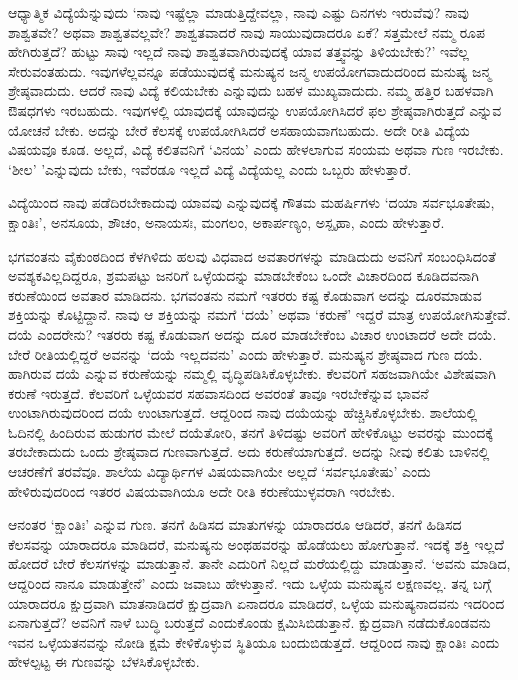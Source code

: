 ಆಧ್ಯಾತ್ಮಿಕ ವಿದ್ಯೆಯೆನ್ನುವುದು `ನಾವು ಇಷ್ಟೆಲ್ಲಾ ಮಾಡುತ್ತಿದ್ದೇವಲ್ಲಾ, ನಾವು ಎಷ್ಟು ದಿನಗಳು ಇರುವೆವು? ನಾವು ಶಾಶ್ವತವೇ? ಅಥವಾ ಶಾಶ್ವತವಲ್ಲವೇ? ಶಾಶ್ವತವಾದರೆ 
ನಾವು ಸಾಯುವುದಾದರೂ ಏಕೆ? ಸತ್ತಮೇಲೆ ನಮ್ಮ ರೂಪ ಹೇಗಿರುತ್ತದೆ? ಹುಟ್ಟು ಸಾವು ಇಲ್ಲದೆ ನಾವು ಶಾಶ್ವತವಾಗಿರುವುದಕ್ಕೆ ಯಾವ 
ತತ್ತ್ವವನ್ನು ತಿಳಿಯಬೇಕು?' ಇವೆಲ್ಲ ಸೇರುವಂತಹುದು. ಇವುಗಳೆಲ್ಲವನ್ನೂ ಪಡೆಯುವುದಕ್ಕೆ ಮನುಷ್ಯನ ಜನ್ಮ ಉಪಯೋಗವಾದುದರಿಂದ ಮನುಷ್ಯ 
ಜನ್ಮ ಶ್ರೇಷ್ಠವಾದುದು. ಆದರೆ ನಾವು ವಿದ್ಯೆ ಕಲಿಯಬೇಕು ಎನ್ನುವುದು ಬಹಳ ಮುಖ್ಯವಾದುದು. ನಮ್ಮ ಹತ್ತಿರ ಬಹಳವಾಗಿ ಔಷಧಗಳು ಇರಬಹುದು. 
ಇವುಗಳಲ್ಲಿ ಯಾವುದಕ್ಕೆ ಯಾವುದನ್ನು ಉಪಯೋಗಿಸಿದರೆ ಫಲ ಶ್ರೇಷ್ಠವಾಗಿರುತ್ತದೆ ಎನ್ನುವ ಯೋಚನೆ ಬೇಕು. ಅದನ್ನು ಬೇರೆ ಕೆಲಸಕ್ಕೆ ಉಪಯೋಗಿಸಿದರೆ 
ಅಸಹಾಯವಾಗಬಹುದು. ಅದೇ ರೀತಿ ವಿದ್ಯೆಯ ವಿಷಯವೂ ಕೂಡ. ಅಲ್ಲದೆ, ವಿದ್ಯೆ ಕಲಿತವನಿಗೆ `ವಿನಯ' ಎಂದು ಹೇಳಲಾಗುವ ಸಂಯಮ ಅಥವಾ 
ಗುಣ ಇರಬೇಕು. `ಶೀಲ' 'ಎನ್ನುವುದು ಬೇಕು, ಇವೆರಡೂ ಇಲ್ಲದೆ ವಿದ್ಯೆ ವಿದ್ಯೆಯಲ್ಲ ಎಂದು ಒಬ್ಬರು ಹೇಳುತ್ತಾರೆ.

ವಿದ್ಯೆಯಿಂದ ನಾವು ಪಡೆದಿರಬೇಕಾದುವು ಯಾವವು ಎನ್ನುವುದಕ್ಕೆ ಗೌತಮ ಮಹರ್ಷಿಗಳು `ದಯಾ ಸರ್ವಭೂತೇಷು, ಕ್ಷಾಂತಿಃ', ಅನಸೂಯ, ಶೌಚಂ, 
ಅನಾಯಸಃ, ಮಂಗಲಂ, ಅಕಾರ್ಪಣ್ಯಂ, ಅಸ್ಪೃಹಾ, ಎಂದು ಹೇಳುತ್ತಾರೆ.

ಭಗವಂತನು ವೈಕುಂಠದಿಂದ ಕೆಳಗಿಳಿದು ಹಲವು ವಿಧವಾದ ಅವತಾರಗಳನ್ನು ಮಾಡಿದುದು ಅವನಿಗೆ ಸಂಬಂಧಿಸಿದಂತೆ ಅವಶ್ಯಕವಿಲ್ಲದಿದ್ದರೂ, ಶ್ರಮಪಟ್ಟು ಜನರಿಗೆ 
ಒಳ್ಳೆಯದನ್ನು ಮಾಡಬೇಕೆಂಬ ಒಂದೇ ವಿಚಾರದಿಂದ ಕೂಡಿದವನಾಗಿ ಕರುಣೆಯಿಂದ ಅವತಾರ ಮಾಡಿದನು. ಭಗವಂತನು ನಮಗೆ ಇತರರು ಕಷ್ಟ 
ಕೊಡುವಾಗ ಅದನ್ನು ದೂರಮಾಡುವ ಶಕ್ತಿಯನ್ನು ಕೊಟ್ಟಿದ್ದಾನೆ. ನಾವು ಆ ಶಕ್ತಿಯನ್ನು ನಮಗೆ `ದಯೆ' ಅಥವಾ `ಕರುಣೆ' ಇದ್ದರೆ ಮಾತ್ರ ಉಪಯೋಗಿಸುತ್ತೇವೆ. ದಯೆ 
ಎಂದರೇನು? ಇತರರು ಕಷ್ಟ ಕೊಡುವಾಗ ಅದನ್ನು ದೂರ ಮಾಡಬೇಕೆಂಬ ವಿಚಾರ ಉಂಟಾದರೆ ಅದೇ ದಯೆ. ಬೇರೆ ರೀತಿಯಲ್ಲಿದ್ದರೆ ಅವನನ್ನು `ದಯೆ ಇಲ್ಲದವನು' ಎಂದು 
ಹೇಳುತ್ತಾರೆ. ಮನುಷ್ಯನ ಶ್ರೇಷ್ಠವಾದ ಗುಣ ದಯೆ. ಹಾಗಿರುವ ದಯೆ ಎನ್ನುವ ಕರುಣೆಯನ್ನು ನಮ್ಮಲ್ಲಿ ವೃದ್ಧಿಪಡಿಸಿಕೊಳ್ಳಬೇಕು. ಕೆಲವರಿಗೆ ಸಹಜವಾಗಿಯೇ 
ವಿಶೇಷವಾಗಿ ಕರುಣೆ ಇರುತ್ತದೆ. ಕೆಲವರಿಗೆ ಒಳ್ಳೆಯವರ ಸಹವಾಸದಿಂದ ಅವರಂತೆ ತಾವೂ ಇರಬೇಕೆನ್ನುವ ಭಾವನೆ ಉಂಟಾಗಿರುವುದರಿಂದ ದಯೆ 
ಉಂಟಾಗುತ್ತದೆ. ಆದ್ದರಿಂದ ನಾವು ದಯೆಯನ್ನು ಹೆಚ್ಚಿಸಿಕೊಳ್ಳಬೇಕು. ಶಾಲೆಯಲ್ಲಿ ಓದಿನಲ್ಲಿ ಹಿಂದಿರುವ ಹುಡುಗರ ಮೇಲೆ ದಯೆತೋರಿ, ತನಗೆ ತಿಳಿದಷ್ಟು 
ಅವರಿಗೆ ಹೇಳಿಕೊಟ್ಟು ಅವರನ್ನು ಮುಂದಕ್ಕೆ ತರಬೇಕಾದುದು ಒಂದು ಶ್ರೇಷ್ಠವಾದ ಗುಣವಾಗುತ್ತದೆ. ಅದು ಕರುಣೆಯಾಗುತ್ತದೆ. ಅದನ್ನು ನೀವು ಕಲಿತು ಬಾಳಿನಲ್ಲಿ 
ಆಚರಣೆಗೆ ತರವೆವೂ. ಶಾಲೆಯ ವಿದ್ಯಾರ್ಥಿಗಳ ವಿಷಯವಾಗಿಯೇ ಅಲ್ಲದೆ `ಸರ್ವಭೂತೇಷು' ಎಂದು ಹೇಳಿರುವುದರಿಂದ ಇತರರ ವಿಷಯವಾಗಿಯೂ ಅದೇ ರೀತಿ ಕರುಣೆಯುಳ್ಳವರಾಗಿ ಇರಬೇಕು. 

ಆನಂತರ `ಕ್ಷಾಂತಿಃ' ಎನ್ನುವ ಗುಣ. ತನಗೆ ಹಿಡಿಸದ ಮಾತುಗಳನ್ನು ಯಾರಾದರೂ ಆಡಿದರೆ, ತನಗೆ ಹಿಡಿಸದ ಕೆಲಸವನ್ನು ಯಾರಾದರೂ 
ಮಾಡಿದರೆ, ಮನುಷ್ಯನು ಅಂಥಹವರನ್ನು ಹೊಡೆಯಲು ಹೋಗುತ್ತಾನೆ. ಇದಕ್ಕೆ ಶಕ್ತಿ ಇಲ್ಲದೆ ಹೋದರೆ ಬೇರೆ ಕೆಲಸಗಳನ್ನು ಮಾಡುತ್ತಾನೆ. 
ತಾನೇ ಎದುರಿಗೆ ನಿಲ್ಲದೆ ಮರೆಯಲ್ಲಿದ್ದು ಮಾಡುತ್ತಾನೆ. `ಅವನು ಮಾಡಿದ, ಆದ್ದರಿಂದ ನಾನೂ ಮಾಡುತ್ತೇನೆ' ಎಂದು ಜವಾಬು ಹೇಳುತ್ತಾನೆ. ಇದು ಒಳ್ಳೆಯ 
ಮನುಷ್ಯನ ಲಕ್ಷಣವಲ್ಲ. ತನ್ನ ಬಗ್ಗೆ ಯಾರಾದರೂ ಕ್ಷುದ್ರವಾಗಿ ಮಾತನಾಡಿದರೆ ಕ್ಷುದ್ರವಾಗಿ ಏನಾದರೂ ಮಾಡಿದರೆ, ಒಳ್ಳೆಯ ಮನುಷ್ಯನಾದವನು ಇದರಿಂದ 
ಏನಾಗುತ್ತದೆ? ಅವನಿಗೆ ನಾಳೆ ಬುದ್ಧಿ ಬರುತ್ತದೆ ಎಂದುಕೊಂಡು ಕ್ಷಮಿಸಿಬಿಡುತ್ತಾನೆ. ಕ್ಷುದ್ರವಾಗಿ ನಡೆದುಕೊಂಡವನು ಇವನ ಒಳ್ಳೆಯತನವನ್ನು ನೋಡಿ 
ಕ್ಷಮೆ ಕೇಳಿಕೊಳ್ಳುವ ಸ್ಥಿತಿಯೂ ಬಂದುಬಿಡುತ್ತದೆ. ಆದ್ದರಿಂದ ನಾವು ಕ್ಷಾಂತಿಃ ಎಂದು ಹೇಳಲ್ಪಟ್ಟ ಈ ಗುಣವನ್ನು ಬೆಳಸಿಕೊಳ್ಳಬೇಕು.

